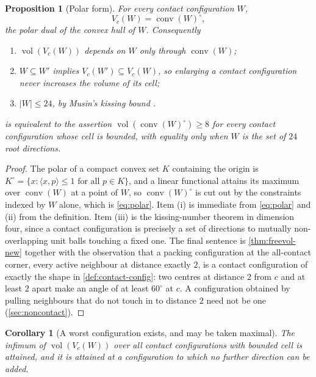 \documentclass[11pt,reqno]{amsart}
\renewcommand{\_}{\origunderscore\allowbreak}
\numberwithin{equation}{section}
\theoremstyle{plain}
\newtheorem{prop}[thm]{Proposition}
\newtheorem{cor}[thm]{Corollary}
\theoremstyle{definition}
\theoremstyle{remark}
\DeclareMathOperator{\vol}{vol}
\DeclareMathOperator{\conv}{conv}
\begin{document}
\begin{prop}[Polar form]\label{prop:polar-form}
For every contact configuration $W$,
\begin{equation}\label{eq:polar}
  V_c(W)=\conv(W)^{\circ},
\end{equation}
the polar dual of the convex hull of $W$. Consequently
\begin{enumerate}[label=\textup{(\roman*)},leftmargin=2.2em]
\item $\vol(V_c(W))$ depends on $W$ only through $\conv(W)$;
\item $W\subseteq W'$ implies $V_c(W')\subseteq V_c(W)$, so enlarging a
contact configuration never increases the volume of its cell;
\item $|W|\le24$, by Musin's kissing bound \cite{Mus08}.
\end{enumerate}
 is equivalent to the assertion
$\vol(\conv(W)^{\circ})\ge8$ for every contact configuration whose cell
is bounded, with equality only when $W$ is the set of $24$ root
directions.
\end{prop}

\begin{proof}
The polar of a compact convex set $K$ containing the origin is
$K^{\circ}=\{x:\langle x,p\rangle\le1\text{ for all }p\in K\}$, and a
linear functional attains its maximum over $\conv(W)$ at a point of $W$,
so $\conv(W)^{\circ}$ is cut out by the constraints indexed by $W$
alone, which is \eqref{eq:polar}. Item (i) is immediate from
\eqref{eq:polar} and (ii) from the definition. Item (iii) is the
kissing-number theorem in dimension four, since a contact configuration
is precisely a set of directions to mutually non-overlapping unit balls
touching a fixed one. The final sentence is
\cref{thm:freevol-new} together with the observation that a packing
configuration at the all-contact corner, every active neighbour at
distance exactly $2$, is a contact configuration of exactly the shape in
\cref{def:contact-config}: two centres at distance $2$ from $c$ and at
least $2$ apart make an angle of at least $60^\circ$ at $c$. A
configuration obtained by pulling neighbours that do not touch in to
distance $2$ need not be one (\cref{sec:noncontact}).
\end{proof}

\begin{cor}[A worst configuration exists, and may be taken maximal]\label{cor:minimiser}
The infimum of $\vol(V_c(W))$ over all contact configurations with
bounded cell is attained, and it is attained at a configuration to which
no further direction can be added.
\end{cor}
\end{document}
